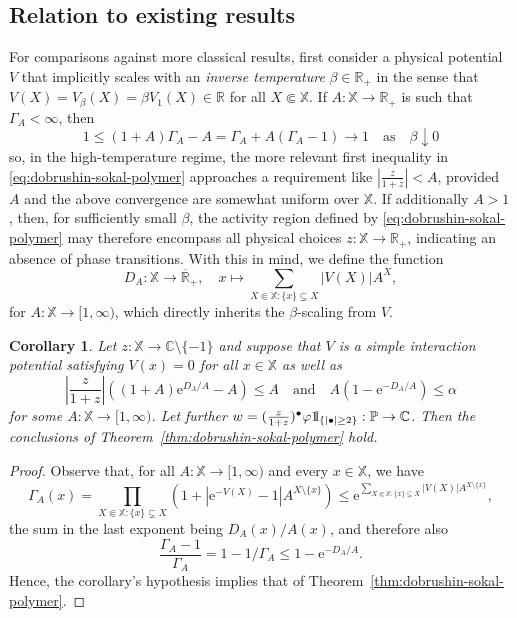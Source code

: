 \documentclass[10pt,a4paper]{amsart}
\newtheorem{cor}[theorem]{Corollary}
\newcommand{\e}{\mathrm{e}}
\newcommand{\R}{\mathbb{R}}
\newcommand{\C}{\mathbb{C}}
\renewcommand{\P}{\mathbb{P}}
\newcommand{\X}{\mathbb X}
\def\1{{\mathchoice {1\mskip-4mu\mathrm l}      
{1\mskip-4mu\mathrm l}
{1\mskip-4.5mu\mathrm l} {1\mskip-5mu\mathrm l}}}
\begin{document}
\subsection{Relation to existing results}

For comparisons against more classical results, first consider a physical potential $V$ that implicitly scales with an \emph{inverse temperature} $\beta \in \R_+$ in the sense that $V(X) = V_\beta(X) = \beta V_1(X) \in \R$ for all $X \Subset \X$. 
If $A : \X \to \R_+$ is such that $\Gamma_A < \infty$, then
\[
	1 \leq (1+A) \Gamma_A - A = \Gamma_A + A (\Gamma_A - 1) \to 1 \quad \text{as} \quad \beta \downarrow 0
\]
so, in the high-temperature regime, the more relevant first inequality in \eqref{eq:dobrushin-sokal-polymer} approaches a requirement like $|\frac{z}{1+z}| < A$, provided $A$ and the above convergence are somewhat uniform over $\X$. 
If additionally $A > 1$, then, for sufficiently small $\beta$, the activity region defined by \eqref{eq:dobrushin-sokal-polymer} may therefore encompass all physical choices $z : \X \to \R_+$, indicating an absence of phase transitions. 
With this in mind, we define the function
\[
	D_A : \X \to \overline{\R}_+, \quad x \mapsto \sum_{X \Subset \X : \{x\} \subsetneq X} |V(X)| A^X,
\]
for $A : \X \to [1,\infty)$, which directly inherits the $\beta$-scaling from $V$.

\begin{cor} \label{cor:gallavotti-miracle-sole-robinson-refined}
	Let $z : \X \to \C \setminus \{-1\}$ and suppose that $V$ is a simple interaction potential satisfying $V(x) = 0$ for all $x \in \X$ as well as
	\[
		|{\textstyle \frac{z}{1+z}}| ((1 + A) \e^{D_A/A} - A) \leq A \quad \text{and} \quad A (1-\e^{-D_A / A}) \leq \alpha
	\]
	for some $A : \X \to [1,\infty)$. 
	Let further $w = (\frac{z}{1+z})^\bullet \varphi \1_{\{|\bullet| \geq 2\}} : \P \to \C$. 
	Then the conclusions of Theorem~\ref{thm:dobrushin-sokal-polymer} hold.
\end{cor}

\begin{proof}
	Observe that, for all $A : \X \to [1,\infty)$ and every $x \in \X$, we have 
	\[
		\Gamma_A(x) = \prod_{X \Subset \X : \{x\} \subsetneq X} (1+|\e^{-V(X)}-1| A^{X \setminus \{x\}}) \leq \e^{\sum_{X \Subset \X : \{x\} \subsetneq X} |V(X)| A^{X \setminus \{x\}}},
	\]
	the sum in the last exponent being $D_A(x)/A(x)$, and therefore also
	\[
		{\textstyle \frac{\Gamma_A-1}{\Gamma_A}} = 1 - 1/\Gamma_A \leq 1 - \e^{-D_A / A}.
	\]
	Hence, the corollary's hypothesis implies that of Theorem~\ref{thm:dobrushin-sokal-polymer}.
\end{proof}
\end{document}
